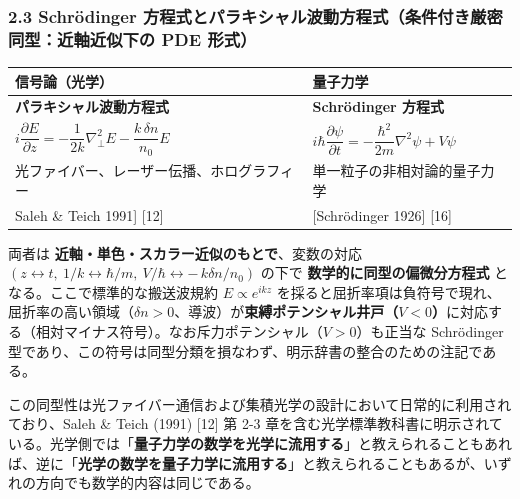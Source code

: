 \documentclass[
]{ltjsarticle}
\newcounter{none} %
\begin{document}
\subsubsection{2.3 Schrödinger
方程式とパラキシャル波動方程式（条件付き厳密同型：近軸近似下の PDE
形式）}\label{schruxf6dinger-ux65b9ux7a0bux5f0fux3068ux30d1ux30e9ux30adux30b7ux30e3ux30ebux6ce2ux52d5ux65b9ux7a0bux5f0fux6761ux4ef6ux4ed8ux304dux53b3ux5bc6ux540cux578bux8fd1ux8ef8ux8fd1ux4f3cux4e0bux306e-pde-ux5f62ux5f0f}

{\def\LTcaptype{none} %
\begin{longtable}[]{@{}
  >{\raggedright\arraybackslash}p{}
  >{\raggedright\arraybackslash}p{}@{}}
\toprule\noalign{}
\begin{minipage}[b]{\linewidth}\raggedright
信号論（光学）
\end{minipage} & \begin{minipage}[b]{\linewidth}\raggedright
量子力学
\end{minipage} \\
\midrule\noalign{}
\endhead
\bottomrule\noalign{}
\endlastfoot
\textbf{パラキシャル波動方程式} & \textbf{Schrödinger 方程式} \\
\(i\dfrac{\partial E}{\partial z} = -\dfrac{1}{2k}\nabla_\perp^2 E - \dfrac{k\,\delta n}{n_0}E\)
&
\(i\hbar \dfrac{\partial \psi}{\partial t} = -\dfrac{\hbar^2}{2m}\nabla^2 \psi + V\psi\) \\
光ファイバー、レーザー伝播、ホログラフィー &
単一粒子の非相対論的量子力学 \\
{[}Saleh \& Teich 1991{]} {[}12{]} & {[}Schrödinger 1926{]} {[}16{]} \\
\end{longtable}
}

両者は \textbf{近軸・単色・スカラー近似のもとで}、変数の対応
\((z \leftrightarrow t,\ 1/k \leftrightarrow \hbar/m,\ V/\hbar \leftrightarrow -\,k\delta n/n_0)\)
の下で \textbf{数学的に同型の偏微分方程式}
となる。ここで標準的な搬送波規約 \(E \propto e^{ikz}\)
を採ると屈折率項は負符号で現れ、屈折率の高い領域（\(\delta n>0\)、導波）が\textbf{束縛ポテンシャル井戸（\(V<0\)）}に対応する（相対マイナス符号）。なお斥力ポテンシャル（\(V>0\)）も正当な
Schrödinger
型であり、この符号は同型分類を損なわず、明示辞書の整合のための注記である。

この同型性は光ファイバー通信および集積光学の設計において日常的に利用されており、Saleh
\& Teich (1991) {[}12{]} 第 2-3
章を含む光学標準教科書に明示されている。光学側では「\textbf{量子力学の数学を光学に流用する}」と教えられることもあれば、逆に「\textbf{光学の数学を量子力学に流用する}」と教えられることもあるが、いずれの方向でも数学的内容は同じである。
\end{document}
